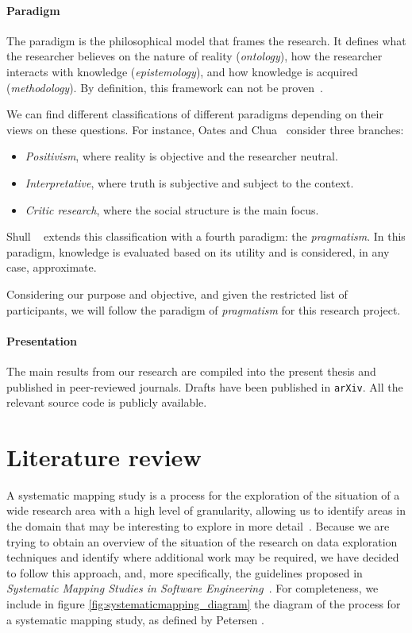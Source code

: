 \paragraph{Paradigm}
\label{method:paradigm}
The paradigm is the philosophical model that frames the research.
It defines what the researcher believes on the nature
of reality (\emph{ontology}), how the researcher interacts with
knowledge (\emph{epistemology}), and how knowledge is acquired
(\emph{methodology}). By definition, this framework can not be proven~\cite{Guba1990,Guba1994}.

We can find different classifications of different paradigms depending on
their views on these questions. For instance, Oates and Chua~\cite{Chua1986}
consider three branches:

\begin{itemize}
    \item \emph{Positivism}, where reality is objective and the researcher neutral.
    \item \emph{Interpretative}, where truth is subjective and subject to the context.
    \item \emph{Critic research}, where the social structure is the main focus.
\end{itemize}

Shull \etal~\cite{Shull2008} extends this classification with a fourth paradigm:
the \emph{pragmatism}. In this paradigm, knowledge is evaluated based on its
utility and is considered, in any case, approximate.

Considering our purpose and objective, and given the restricted list of
participants, we will follow the paradigm of \emph{pragmatism} for this research project.

\paragraph{Presentation}
\label{method:presentation}
The main results from our research are compiled into the present thesis
and published in peer-reviewed journals. Drafts have been published in \texttt{arXiv}.
All the relevant source code is publicly available.

\section{Literature review}
\label{sec:method_literature_review}
A systematic mapping study is a process for the exploration of
the situation of a wide research area with a high level of granularity,
allowing us to identify areas in the domain that may be interesting to
explore in more detail~\cite{Kitchenham2007}. Because we are trying to obtain
an overview of the situation of the research on data exploration techniques
and identify where additional work may be required, we have decided to follow this
approach, and, more specifically, the guidelines proposed in
\emph{Systematic Mapping Studies in Software Engineering}~\cite{Petersen2007}.
For completeness, we include in figure \ref{fig:systematicmapping_diagram} the
diagram of the process for a systematic mapping study, as defined by
Petersen \etal.

